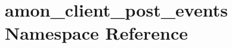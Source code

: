\hypertarget{namespaceamon__client__post__events}{\section{amon\-\_\-client\-\_\-post\-\_\-events Namespace Reference}
\label{namespaceamon__client__post__events}
}
